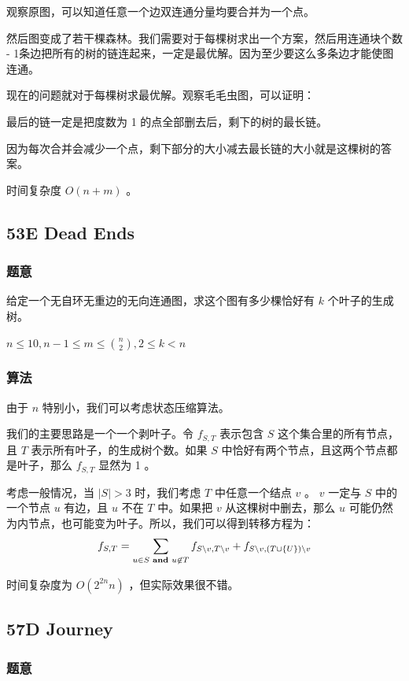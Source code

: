 \documentclass[11pt]{article}
\begin{document}
    观察原图，可以知道任意一个边双连通分量均要合并为一个点。

    然后图变成了若干棵森林。我们需要对于每棵树求出一个方案，然后用连通块个数 - 1条边把所有的树的链连起来，一定是最优解。因为至少要这么多条边才能使图连通。

    现在的问题就对于每棵树求最优解。观察毛毛虫图，可以证明：
\begin{theorem}
   最后的链一定是把度数为 1 的点全部删去后，剩下的树的最长链。
\end{theorem}
    因为每次合并会减少一个点，剩下部分的大小减去最长链的大小就是这棵树的答案。

    时间复杂度 $O(n + m)$ 。
\subsection{53E   Dead Ends}
\label{sec-4-4}
\subsubsection{题意}
\label{sec-4-4-1}

    给定一个无自环无重边的无向连通图，求这个图有多少棵恰好有 $k$ 个叶子的生成树。

    $n \leq 10, n - 1 \leq m \leq {n \choose 2}, 2 \leq k < n$
\subsubsection{算法}
\label{sec-4-4-2}

    由于 $n$ 特别小，我们可以考虑状态压缩算法。

    我们的主要思路是一个一个剥叶子。令 $f_{S, T}$ 表示包含 $S$ 这个集合里的所有节点，且 $T$ 表示所有叶子，的生成树个数。如果 $S$ 中恰好有两个节点，且这两个节点都是叶子，那么 $f_{S, T}$ 显然为 1 。

    考虑一般情况，当 $|S| > 3$ 时，我们考虑 $T$ 中任意一个结点 $v$ 。 $v$ 一定与 $S$ 中的一个节点 $u$ 有边，且 $u$ 不在 $T$ 中。如果把 $v$ 从这棵树中删去，那么 $u$ 可能仍然为内节点，也可能变为叶子。所以，我们可以得到转移方程为：
    $$f_{S, T} = \sum_{u \in S \hspace{0.1cm} \textbf{and} \hspace{0.1cm} u \not\in T} f_{S \backslash v, T \backslash v} + f_{S \backslash v, (T \cup \{U\}) \backslash v}$$

    时间复杂度为 $O(2^{2n} n)$ ，但实际效果很不错。
\subsection{57D   Journey}
\label{sec-4-5}
\subsubsection{题意}
\label{sec-4-5-1}
\end{document}
